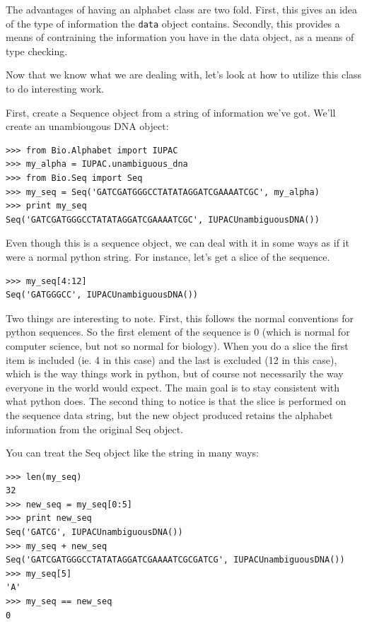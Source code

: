 \documentclass{report}
\begin{document}
The advantages of having an alphabet class are two fold. First, this gives an idea of the type of information the \verb|data| object contains. Secondly, this provides a means of contraining the information you have in the data object, as a means of type checking.


Now that we know what we are dealing with, let's look at how to utilize this class to do interesting work.


First, create a Sequence object from a string of information we've got. We'll create an unambiougous DNA object:

\begin{verbatim}
>>> from Bio.Alphabet import IUPAC
>>> my_alpha = IUPAC.unambiguous_dna
>>> from Bio.Seq import Seq
>>> my_seq = Seq('GATCGATGGGCCTATATAGGATCGAAAATCGC', my_alpha)
>>> print my_seq
Seq('GATCGATGGGCCTATATAGGATCGAAAATCGC', IUPACUnambiguousDNA())
\end{verbatim}


Even though this is a sequence object, we can deal with it in some ways as if it were a normal python string. For instance, let's get a slice of the sequence.

\begin{verbatim}
>>> my_seq[4:12]
Seq('GATGGGCC', IUPACUnambiguousDNA())
\end{verbatim}

Two things are interesting to note. First, this follows the normal conventions for python sequences.  So the first element of the sequence is 0 (which is normal for computer science, but not so normal for biology). When you do a slice the first item is included (ie. 4 in this case) and the last is excluded (12 in this case), which is the way things work in python, but of course not necessarily the way everyone in the world would expect. The main goal is to stay consistent with what python does. The second thing to notice is that the slice is performed on the sequence data string, but the new object produced retains the alphabet information from the original Seq object.


You can treat the Seq object like the string in many ways:

\begin{verbatim}
>>> len(my_seq)
32
>>> new_seq = my_seq[0:5]
>>> print new_seq
Seq('GATCG', IUPACUnambiguousDNA())
>>> my_seq + new_seq
Seq('GATCGATGGGCCTATATAGGATCGAAAATCGCGATCG', IUPACUnambiguousDNA())
>>> my_seq[5]
'A'
>>> my_seq == new_seq
0
\end{verbatim}
\end{document}
